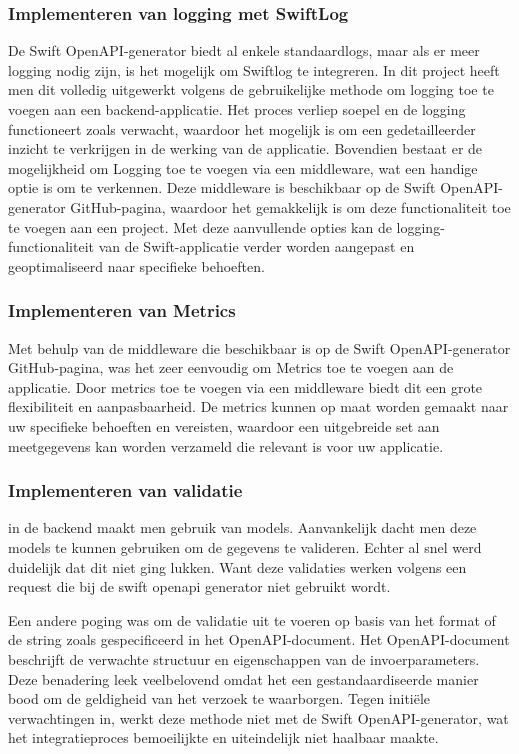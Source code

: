 \subsubsection{Implementeren van logging met SwiftLog}
De Swift OpenAPI-generator biedt al enkele standaardlogs, maar als er meer logging nodig zijn, is het mogelijk om Swiftlog te integreren. In dit project heeft men dit volledig uitgewerkt volgens de gebruikelijke methode om logging toe te voegen aan een backend-applicatie. Het proces verliep soepel en de logging functioneert zoals verwacht, waardoor het mogelijk is om een gedetailleerder inzicht te verkrijgen in de werking van de applicatie.
Bovendien bestaat er de mogelijkheid om Logging toe te voegen via een middleware, wat een handige optie is om te verkennen. Deze middleware is beschikbaar op de Swift OpenAPI-generator GitHub-pagina, waardoor het gemakkelijk is om deze functionaliteit toe te voegen aan een project. Met deze aanvullende opties kan de logging-functionaliteit van de Swift-applicatie verder worden aangepast en geoptimaliseerd naar specifieke behoeften.


\subsubsection{Implementeren van Metrics}
Met behulp van de middleware die beschikbaar is op de Swift OpenAPI-generator GitHub-pagina, was het zeer eenvoudig om Metrics toe te voegen aan de applicatie.  Door metrics toe te voegen via een middleware biedt dit een grote flexibiliteit en aanpasbaarheid. De metrics kunnen op maat worden gemaakt naar uw specifieke behoeften en vereisten, waardoor een uitgebreide set aan meetgegevens kan worden verzameld die relevant is voor uw applicatie.

\subsubsection{Implementeren van validatie}
in de backend maakt men gebruik van models. Aanvankelijk dacht men deze models te kunnen gebruiken om de gegevens te valideren. Echter al snel werd duidelijk dat dit niet ging lukken. Want deze validaties werken volgens een request die bij de swift openapi generator niet gebruikt wordt. 

Een andere poging was om de validatie uit te voeren op basis van het format of de string zoals gespecificeerd in het OpenAPI-document. Het OpenAPI-document beschrijft de verwachte structuur en eigenschappen van de invoerparameters. Deze benadering leek veelbelovend omdat het een gestandaardiseerde manier bood om de geldigheid van het verzoek te waarborgen. Tegen initiële verwachtingen in, werkt deze methode niet met de Swift OpenAPI-generator, wat het integratieproces bemoeilijkte en uiteindelijk niet haalbaar maakte.

